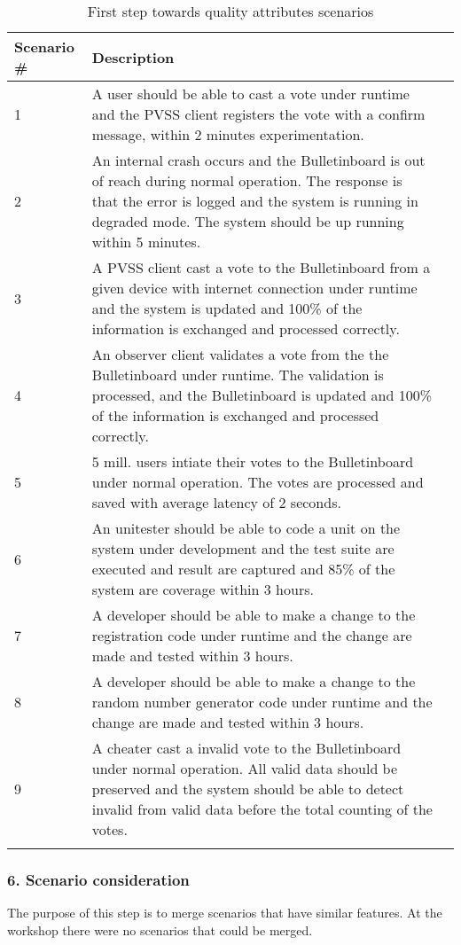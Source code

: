 \begin{longtable}[c]{|p{1.8cm}|p{8cm}|l|} 
\hline
Scenario \#      & Description   \\ \hline
1     & A user should be able to cast a vote under runtime and the PVSS client registers the vote with a confirm message, within 2 minutes experimentation. \\ \hline
2     & An internal crash occurs and the Bulletinboard is out of reach during normal operation. The response is that the error is logged and the system is running in degraded mode. The system should be up running within 5 minutes. \\ \hline
3     & A PVSS client cast a vote to the  Bulletinboard from a given device  with internet connection  under runtime and the system is updated and 100\% of the information is exchanged and processed correctly. \\ \hline
4     & An observer client validates a vote from the the Bulletinboard  under runtime. The validation is processed, and the Bulletinboard is updated and 100\% of the information is exchanged and processed correctly. \\ \hline
5      & 5 mill. users intiate their votes to the Bulletinboard under normal operation. The votes are processed and saved with average latency of 2 seconds. \\ \hline
6      & An unitester should be able to code a unit on the system under development and the test suite are executed  and result are captured and 85\% of the system are coverage  within 3 hours. \\ \hline
7       & A developer should be able to make a change to the registration code under  runtime and the change are made and tested within 3 hours.\\ \hline
8       & A developer should be able to make a change to the random number generator code under runtime and the change are made and tested within 3 hours.\\ \hline
9         & A cheater cast a invalid vote to the Bulletinboard under normal operation. All valid data should be preserved and the system should be able to detect invalid from  valid data before the total counting of the votes.\\ \hline

\caption{First step towards quality attributes scenarios}
\label{tab:myfirstlongtable}
\end{longtable}

\subsubsection{6. Scenario consideration}
The purpose of this step is to merge scenarios that have similar features. At the workshop there were no scenarios that could be merged.\\

